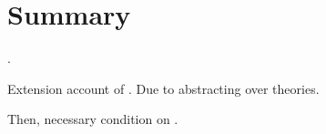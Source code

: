 \section*{Summary}

\begin{note}
  .

  Extension account of \tor{}.
  Due to abstracting over theories.

  Then, necessary condition on \tR{}.
\end{note}







